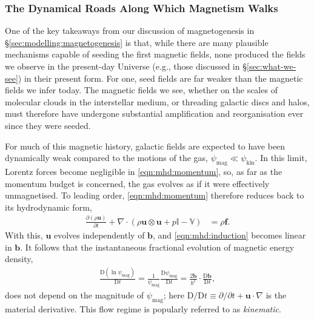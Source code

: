 \documentclass[12pt,twoside]{extreport}
\newcommand{\rbrac}[1]{\left( #1 \right)} %
\newcommand{\mVector}[1]{\bm{#1}} %
\newcommand{\mTensor}[1]{\mathbb{#1}} %
\newcommand{\mpp}[1]{\partial #1}
\newcommand{\mDD}[1]{\mathrm{D} #1}
\newcommand{\mppFrac}[2]{\frac{\mpp{#1}}{\mpp{#2}}}
\newcommand{\mDDFrac}[2]{\frac{\mDD{#1}}{\mDD{#2}}}
\newcommand{\eg}{e.g.,\xspace} %
\begin{document}
\subsubsection{The Dynamical Roads Along Which Magnetism Walks}
\label{sec:evolve:paths}

One of the key takeaways from our discussion of magnetogenesis in \S\ref{sec:modelling:magnetogenesis} is that, while there are many plausible mechanisms capable of seeding the first magnetic fields, none produced the fields we observe in the present-day Universe (\eg those discussed in \S\ref{sec:what-we-see}) in their present form. For one, seed fields are far weaker than the magnetic fields we infer today. The magnetic fields we see, whether on the scales of molecular clouds in the interstellar medium, or threading galactic discs and halos, must therefore have undergone substantial amplification and reorganisation ever since they were seeded.

For much of this magnetic history, galactic fields are expected to have been dynamically weak compared to the motions of the gas, $\psi_\mathrm{mag} \ll \psi_\mathrm{kin}$. In this limit, Lorentz forces become negligible in \autoref{eqn:mhd:momentum}, so, as far as the momentum budget is concerned, the gas evolves as if it were effectively unmagnetised. To leading order, \autoref{eqn:mhd:momentum} therefore reduces back to its hydrodynamic form,
\begin{align}
    \mppFrac{(\rho \mVector{u})}{t}
        + \nabla \cdot \rbrac{
            \rho \mVector{u}\otimes\mVector{u}
            + p \mTensor{I}
            - \mTensor{V}
        }
        &= \rho \mVector{f}
    .
\end{align}
With this, $\mVector{u}$ evolves independently of $\mVector{b}$, and \autoref{eqn:mhd:induction} becomes linear in $\mVector{b}$. It follows that the instantaneous fractional evolution of magnetic energy density,
\begin{align}
    \mDDFrac{(\ln\psi_\mathrm{mag})}{t}
        = \frac{1}{\psi_\mathrm{mag}} \mDDFrac{\psi_\mathrm{mag}}{t}
        = \frac{2\mVector{b}}{b^2} \cdot \mDDFrac{\mVector{b}}{t}
    ,
\end{align}
does not depend on the magnitude of $\psi_\mathrm{mag}$; here $\mDD / \mDD t \equiv \partial/\partial t + \mVector{u}\cdot\nabla$ is the material derivative. This flow regime is popularly referred to as \textit{kinematic}.
\end{document}
